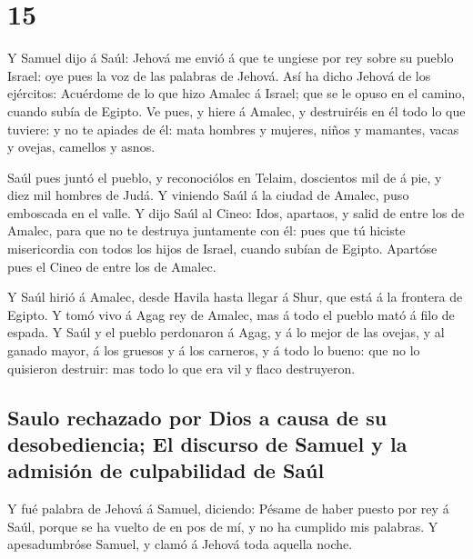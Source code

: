\hypertarget{section-14}{%
\section{15}\label{section-14}}

 Y Samuel dijo á Saúl: Jehová me envió á que te ungiese
por rey sobre su pueblo Israel: oye pues la voz de las palabras de
Jehová.  Así ha dicho Jehová de los ejércitos: Acuérdome
de lo que hizo Amalec á Israel; que se le opuso en el camino, cuando
subía de Egipto.  Ve pues, y hiere á Amalec, y destruiréis
en él todo lo que tuviere: y no te apiades de él: mata hombres y
mujeres, niños y mamantes, vacas y ovejas, camellos y asnos.

 Saúl pues juntó el pueblo, y reconociólos en Telaim,
doscientos mil de á pie, y diez mil hombres de Judá.  Y
viniendo Saúl á la ciudad de Amalec, puso emboscada en el valle.
 Y dijo Saúl al Cineo: Idos, apartaos, y salid de entre
los de Amalec, para que no te destruya juntamente con él: pues que tú
hiciste misericordia con todos los hijos de Israel, cuando subían de
Egipto. Apartóse pues el Cineo de entre los de Amalec.

 Y Saúl hirió á Amalec, desde Havila hasta llegar á Shur,
que está á la frontera de Egipto.  Y tomó vivo á Agag rey
de Amalec, mas á todo el pueblo mató á filo de espada.  Y
Saúl y el pueblo perdonaron á Agag, y á lo mejor de las ovejas, y al
ganado mayor, á los gruesos y á los carneros, y á todo lo bueno: que no
lo quisieron destruir: mas todo lo que era vil y flaco destruyeron.

\hypertarget{saulo-rechazado-por-dios-a-causa-de-su-desobediencia-el-discurso-de-samuel-y-la-admisiuxf3n-de-culpabilidad-de-sauxfal}{%
\subsection{Saulo rechazado por Dios a causa de su desobediencia; El
discurso de Samuel y la admisión de culpabilidad de
Saúl}\label{saulo-rechazado-por-dios-a-causa-de-su-desobediencia-el-discurso-de-samuel-y-la-admisiuxf3n-de-culpabilidad-de-sauxfal}}

 Y fué palabra de Jehová á Samuel, diciendo:
 Pésame de haber puesto por rey á Saúl, porque se ha
vuelto de en pos de mí, y no ha cumplido mis palabras. Y apesadumbróse
Samuel, y clamó á Jehová toda aquella noche.


